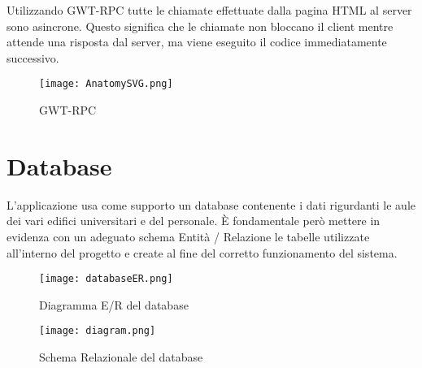 Utilizzando  GWT-RPC  tutte  le  chiamate  effettuate  dalla  pagina  HTML  al  server 
sono  asincrone.
Questo  significa  che  le  chiamate  non  bloccano  il  client  mentre attende   una 
risposta   dal   server,   ma   viene  eseguito   il   codice   immediatamente 
successivo.

\begin{figure}[!htb]
\centering%
\texttt{[image: AnatomySVG.png]}%
\caption{GWT-RPC }\label{fig:GWT-RPC}%
\end{figure}

\section*{Database}
L'applicazione usa come supporto un database contenente i dati rigurdanti le aule dei vari edifici universitari e del personale.
\`E fondamentale però mettere in evidenza con un adeguato schema Entità / Relazione le 
tabelle utilizzate all’interno del progetto e create al fine del corretto funzionamento del 
sistema.

\begin{figure}[!htb]
\centering
\texttt{[image: databaseER.png]}
\caption{Diagramma E/R del database}\label{fig:database}
\end{figure}
\begin{figure}[!htb]
\centering
\texttt{[image: diagram.png]}
\caption{Schema Relazionale del database}\label{fig:databaseSchema}
\end{figure}